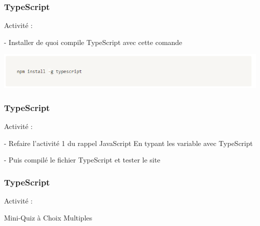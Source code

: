 \documentclass[10pt]{beamer}
\begin{document}
	\begin{frame}
		\frametitle{TypeScript}

		Activité : \newline \newline

		- Installer de quoi compile TypeScript avec cette comande \newline \newline

		\includegraphics[width=16cm]{assets/tsInstall}\newline


	\end{frame}

	\begin{frame}
		\frametitle{TypeScript}

		Activité : \newline \newline

		- Refaire l'activité 1 du rappel JavaScript \newline
		En typant les variable avec TypeScript \newline \newline

		- Puis compilé le fichier TypeScript et tester le site \newline \newline



	\end{frame}

	\begin{frame}
		\frametitle{TypeScript}

		Activité : \newline \newline

		Mini-Quiz à Choix Multiples


	\end{frame}

\end{document}
